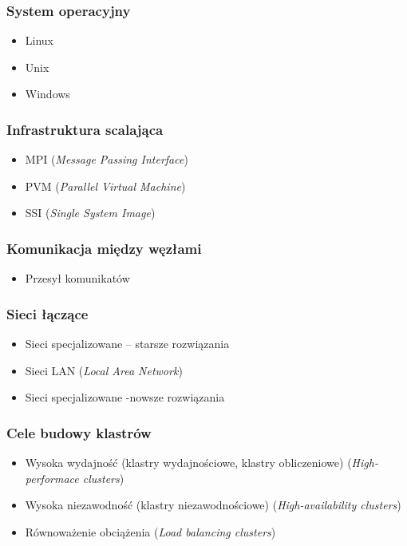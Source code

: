 \documentclass[a4paper,twoside]{article}
\begin{document}
\subsubsection{System operacyjny}
\begin{itemize}
	\item Linux
	\item Unix
	\item Windows
\end{itemize}
\subsubsection{Infrastruktura scalająca}
\begin{itemize}
	\item MPI (\emph{Message Passing Interface})
	\item PVM (\emph{Parallel Virtual Machine})
	\item SSI (\emph{Single System Image})
\end{itemize}
\subsubsection{Komunikacja między węzłami}
\begin{itemize}
	\item Przesył komunikatów
\end{itemize}
\subsubsection{Sieci łączące}
\begin{itemize}
	\item Sieci specjalizowane – starsze rozwiązania
	\item Sieci LAN (\emph{Local Area Network})
	\item Sieci specjalizowane -nowsze rozwiązania
\end{itemize}
\subsubsection{Cele budowy klastrów}
\begin{itemize}
	\item Wysoka wydajność (klastry wydajnościowe, klastry obliczeniowe) (\emph{High-performace clusters})
	\item Wysoka niezawodność (klastry niezawodnościowe) (\emph{High-availability clusters})
	\item Równoważenie obciążenia (\emph{Load balancing clusters})
\end{itemize}
\end{document}
